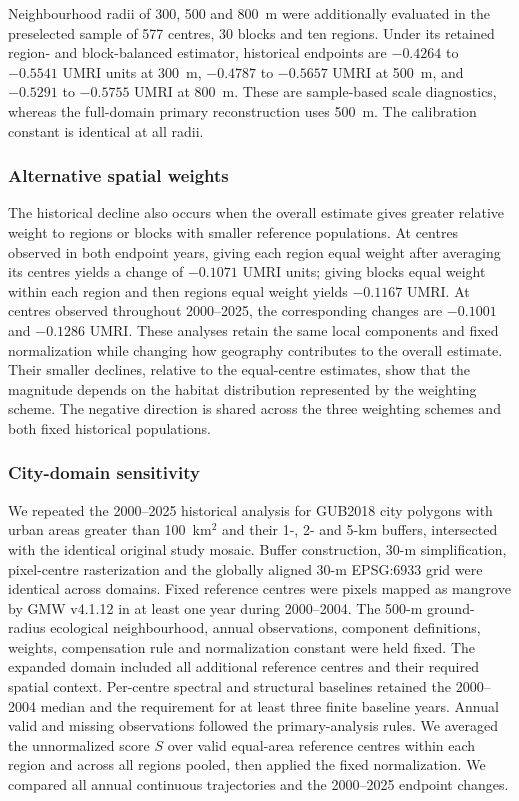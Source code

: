 Neighbourhood radii of 300, 500 and 800~m were additionally evaluated in the preselected sample of 577 centres, 30 blocks and ten regions. Under its retained region- and block-balanced estimator, historical endpoints are $-0.4264$ to $-0.5541$ UMRI units at 300~m, $-0.4787$ to $-0.5657$ UMRI at 500~m, and $-0.5291$ to $-0.5755$ UMRI at 800~m. These are sample-based scale diagnostics, whereas the full-domain primary reconstruction uses 500~m. The calibration constant is identical at all radii. 

\subsubsection{Alternative spatial weights}
The historical decline also occurs when the overall estimate gives greater relative weight to regions or blocks with smaller reference populations. At centres observed in both endpoint years, giving each region equal weight after averaging its centres yields a change of $-0.1071$ UMRI units; giving blocks equal weight within each region and then regions equal weight yields $-0.1167$ UMRI. At centres observed throughout 2000--2025, the corresponding changes are $-0.1001$ and $-0.1286$ UMRI. These analyses retain the same local components and fixed normalization while changing how geography contributes to the overall estimate. Their smaller declines, relative to the equal-centre estimates, show that the magnitude depends on the habitat distribution represented by the weighting scheme. The negative direction is shared across the three weighting schemes and both fixed historical populations.

\subsubsection{City-domain sensitivity}
We repeated the 2000--2025 historical analysis for GUB2018 city polygons with urban areas greater than 100~km$^2$ and their 1-, 2- and 5-km buffers, intersected with the identical original study mosaic. Buffer construction, 30-m simplification, pixel-centre rasterization and the globally aligned 30-m EPSG:6933 grid were identical across domains. Fixed reference centres were pixels mapped as mangrove by GMW v4.1.12 in at least one year during 2000--2004. The 500-m ground-radius ecological neighbourhood, annual observations, component definitions, weights, compensation rule and normalization constant were held fixed. The expanded domain included all additional reference centres and their required spatial context. Per-centre spectral and structural baselines retained the 2000--2004 median and the requirement for at least three finite baseline years. Annual valid and missing observations followed the primary-analysis rules. We averaged the unnormalized score $S$ over valid equal-area reference centres within each region and across all regions pooled, then applied the fixed normalization. We compared all annual continuous trajectories and the 2000--2025 endpoint changes.

